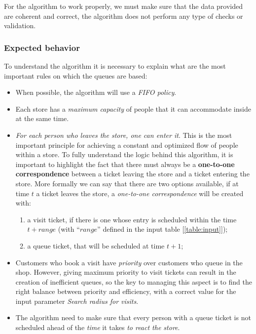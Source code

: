 \FloatBarrier

For the algorithm to work properly, we must make sure that the data provided are coherent and correct, the algorithm does not perform any type of checks or validation.

\subsubsection{Expected behavior}
\label{subsubsect:expectedbehavior}

To understand the algorithm it is necessary to explain what are the most important rules on which the queues are based:

\begin{itemize}[topsep=0pt]
    \item When possible, the algorithm will use a \textit{FIFO policy}.
    \item Each store has a \textit{maximum capacity} of people that it can accommodate inside at the same time.
    \item \textit{For each person who leaves the store, one can enter it}. This is the most important principle for achieving a constant and optimized flow of people within a store. To fully understand the logic behind this algorithm, it is important to highlight the fact that there must always be a \textbf{one-to-one correspondence} between a ticket leaving the store and a ticket entering the store.\newline
    More formally we can say that there are two options available, if at time $t$ a ticket leaves the store, a \textit{one-to-one correspondence} will be created with:
    \begin{enumerate}[topsep=0pt]
        \item a visit ticket, if there is one whose entry is scheduled within the time $t + range$ (with “$range$” defined in the input table [\ref{table:input}]);
        \item a queue ticket, that will be scheduled at time $t + 1$;
    \end{enumerate}
    \item Customers who book a visit have \textit{priority} over customers who queue in the shop. However, giving maximum priority to visit tickets can result in the creation of inefficient queues, so the key to managing this aspect is to find the right balance between priority and efficiency, with a correct value for the input parameter \textit{Search radius for visits}.
    \item The algorithm need to make sure that every person with a queue ticket is not scheduled ahead of the \textit{time} it takes \textit{to react the store}.
\end{itemize}

